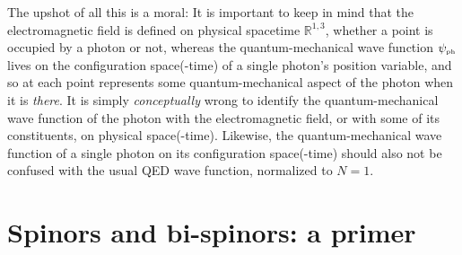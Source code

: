 \documentclass[12pt]{article}
\theoremstyle{definition}
\numberwithin{equation}{section}
\newcommand{\psiPH}{{\psi_{\mbox{\rm\tiny ph}}}}
\newcommand{\Rset}{{\mathbb R}}
\begin{document}
 The upshot of all this is a moral: 
 It is important to keep in mind that the electromagnetic field is defined on physical spacetime $\Rset^{1,3}$, 
whether a point is occupied by a photon or not, whereas the quantum-mechanical wave function $\psiPH$ lives 
on the configuration space(-time) of a single photon's position variable, and so at each point represents some 
quantum-mechanical aspect of the photon when it is \emph{there}.
 It is simply \emph{conceptually} wrong to identify the quantum-mechanical wave function of the photon with the electromagnetic field,
or with some of its constituents, on physical space(-time).
 Likewise, the quantum-mechanical wave function of a single photon on its configuration space(-time) should also not be confused 
with the usual QED wave function, normalized to $N=1$.

\section{Spinors and bi-spinors: a primer}

\label{app:primer}
%
\end{document}

